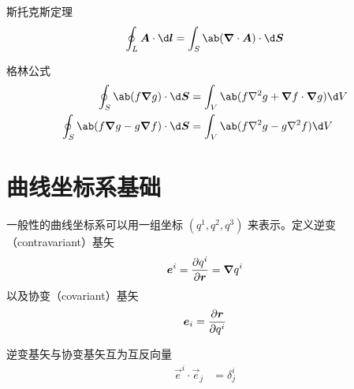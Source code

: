斯托克斯定理
\begin{equation}
    \oint_L \vec{A} \cdot \d \vec{l}
    = \int_S \ab( \dive{\vec{A}} ) \cdot \d \vec{S}
\end{equation}

格林公式
\begin{align}
    \oint_S \ab( f \grad{g} ) \cdot \d \vec{S}
    &= \int_V \ab(
        f \laplacian{g} + \grad{f} \cdot \grad{g}
    ) \d V \\
    \oint_S \ab( f \grad{g} - g \grad{f} ) \cdot \d \vec{S}
    &= \int_V \ab(
        f \laplacian{g} - g \laplacian{f}
    ) \d V
\end{align}

\chapter{曲线坐标系基础}

一般性的曲线坐标系可以用一组坐标 $(q^1, q^2, q^3)$ 来表示。定义逆变（contravariant）基矢
\begin{equation}
    \bm{e}^i = \pdv{q^i}{\bm{r}} = \bm{\nabla}{q^i}
\end{equation}
以及协变（covariant）基矢
\begin{equation}
    \bm{e}_i = \pdv{\bm{r}}{q^i}
\end{equation}

逆变基矢与协变基矢互为互反向量
\begin{align}
    \vec{e}^i \cdot \vec{e}_j &= \delta^i_j
\end{align}
